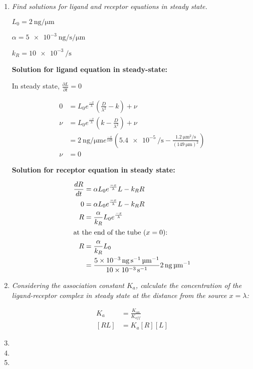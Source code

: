 \documentclass{article} %
\begin{document}
\begin{enumerate}
  \item \textit{Find solutions for ligand and receptor equations in steady state.}

      $L_0=\SI{2}{\nano\g\per\micro\m}$

      $\alpha = \SI{5e-3}{\nano\g\per\s\per\micro\m}$

      $k_R= \SI{10e-3}{\per\s}$


      \textbf{Solution for ligand equation in steady-state:}

      In steady state, $\frac{\partial L}{\partial t} = 0$  

      \begin{align*}
        0 &= L_0e^{\frac{-x}{\lambda}}\left(\frac{D}{\lambda^2} -k \right) + \nu \\
        \nu &= L_0e^{\frac{-x}{\lambda}}\left(k - \frac{D}{\lambda^2} \right) + \nu \\
          &= \SI{2}{\nano\g\per\micro\m}e^{\frac{-x}{149}} \left (\SI{5.4e-5}{\per\s} - \frac{\SI{1.2}{\micro\m^2\per\s}}{(\SI{149}{\micro\m})^2} \right ) \\
          \nu &= 0
      \end{align*}

      \textbf{Solution for receptor equation in steady state:}

      \begin{align*}
        \frac{dR}{dt} &= \alpha L_0 e^{\frac{-x}{\lambda}} L-k_R R \\
        0 &= \alpha L_0 e^{\frac{-x}{\lambda}} L-k_R R \\
        R &= \frac{\alpha}{k_R} L_0e^{\frac{-x}{\lambda}} \\
        \intertext{at the end of the tube ($x=0$):}
        R &= \frac{\alpha}{k_R}L_0 \\
                      &= \frac{\SI{5e-3}{\nano\gram\per\s\per\micro\m}}{\SI{10e-3}{\per\s}} \SI{2}{\nano\gram\per\micro\m} \\
      \end{align*}
        
    \item \textit{Considering the association constant $K_a$, calculate the concentration of the ligand-receptor complex in steady state at the distance from the source $x=\lambda$:}

      \begin{align*}
        K_a &= \frac{K_{on}}{K_{off}} \\
        [RL] &= K_a[R][L] 
      \end{align*}
    \item 
    \item 
    \item 
\end{enumerate}
\end{document}
